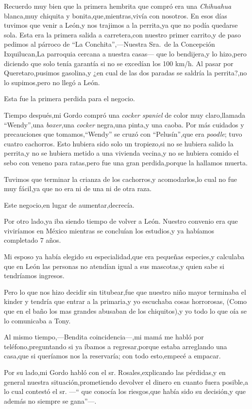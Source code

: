 \documentclass[letterpaper,12pt]{book}
\begin{document}
Recuerdo muy bien que la primera hembrita que compró era una \textit{Chihuahua} blanca,muy chiquita y bonita,que,mientras,vivía con nosotros. En esos días tuvimos que venir a León,y nos trajimos a la perrita,ya que no podía quedarse sola. Esta era la primera salida a carretera,con nuestro primer carrito,y de paso pedimos al párroco de ``La Conchita'',---Nuestra Sra.\ de la Concepción Ixquilucan,La parroquia cercana a nuestra casas--- que lo bendijera,y lo hizo,pero diciendo que solo tenía garantía si no se excedían los 100 km/h. Al pasar por Queretaro,pusimos gasolina,y ¿en cual de las dos paradas se saldría la perrita?,no lo supimos,pero no llegó a León. 

Esta fue la primera perdida para el negocio.

Tiempo después,mi Gordo compró una \textit{cocker spaniel} de color muy claro,llamada ``Wendy'',una \textit{boxer},una \textit{cocker} negra,una pinta,y una caoba. Por más cuidados y precauciones que tomamos,``Wendy'' se cruzó con ``Pelusín'',que era \textit{poodle}; tuvo cuatro cachorros. Esto hubiera sido solo un tropiezo,si no se hubiera salido la perrita,y no se hubiera metido a una vivienda vecina,y no se hubiera comido el sebo con veneno para ratas,pero fue una gran perdida,porque la hallamos muerta. 

Tuvimos que terminar la crianza de los cachorros,y acomodarlos,lo cual no fue muy fácil,ya que no era ni de una ni de otra raza.

Este negocio,en lugar de aumentar,decrecía.

Por otro lado,ya iba siendo tiempo de volver a León. Nuestro convenio era que viviríamos en México mientras se concluían los estudios,y ya habíamos completado 7 años.

Mi esposo ya había elegido su especialidad,que era pequeñas especies,y calculaba que en León las personas no atendían igual a sus mascotas,y quien sabe si tendríamos ingresos.

Pero lo que nos hizo decidir sin titubear,fue que nuestro niño mayor terminaba el kinder y tendría que entrar a la primaria,y yo escuchaba cosas horrorosas, (Como que en el baño los mas grandes abusaban de los chiquitos),y yo todo lo que oía se lo comunicaba a Tony.

Al mismo tiempo,---Bendita coincidencia---,mi mamá me habló por teléfono,preguntando si ya íbamos a regresar,porque estaba arreglando una casa,que si queríamos nos la reservaría; con todo esto,empecé a empacar.

Por su lado,mi Gordo habló con el sr. Rosales,explicando las pérdidas,y en general nuestra situación,prometiendo devolver el dinero en cuanto fuera posible,a lo cual contestó el sr. ---`` que conocía los riesgos,que había  sido su decisión,y que además no siempre se gana''---.
\end{document}
